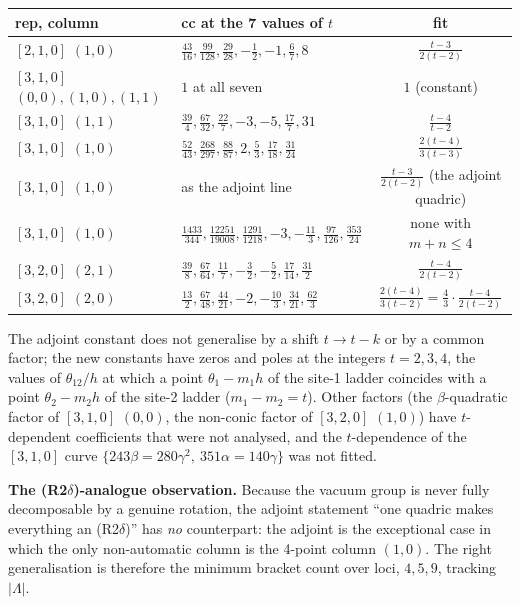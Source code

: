 \documentclass[10pt]{article}
\begin{document}
\begin{center}\small\setlength{\tabcolsep}{4pt}\begin{tabular}{@{}llc@{}}\toprule
\textbf{rep, column} & \textbf{cc at the 7 values of $t$} & \textbf{fit} \\\midrule
$[2,1,0]$ $(1,0)$ & $\tfrac{43}{16},\tfrac{99}{128},\tfrac{29}{28},-\tfrac12,-1,\tfrac67,8$ & $\tfrac{t-3}{2(t-2)}$ \\
$[3,1,0]$ $(0,0),(1,0),(1,1)$ & $1$ at all seven & $1$ (constant) \\
$[3,1,0]$ $(1,1)$ & $\tfrac{39}4,\tfrac{67}{32},\tfrac{22}7,-3,-5,\tfrac{17}7,31$ & $\tfrac{t-4}{t-2}$ \\
$[3,1,0]$ $(1,0)$ & $\tfrac{52}{43},\tfrac{268}{297},\tfrac{88}{87},2,\tfrac53,\tfrac{17}{18},\tfrac{31}{24}$ & $\tfrac{2(t-4)}{3(t-3)}$ \\
$[3,1,0]$ $(1,0)$ & as the adjoint line & $\tfrac{t-3}{2(t-2)}$ (the adjoint quadric) \\
$[3,1,0]$ $(1,0)$ & $\tfrac{1433}{344},\tfrac{12251}{19008},\tfrac{1291}{1218},-3,-\tfrac{11}3,\tfrac{97}{126},\tfrac{353}{24}$ & none with $m+n\le4$ \\
$[3,2,0]$ $(2,1)$ & $\tfrac{39}8,\tfrac{67}{64},\tfrac{11}7,-\tfrac32,-\tfrac52,\tfrac{17}{14},\tfrac{31}2$ & $\tfrac{t-4}{2(t-2)}$ \\
$[3,2,0]$ $(2,0)$ & $\tfrac{13}2,\tfrac{67}{48},\tfrac{44}{21},-2,-\tfrac{10}3,\tfrac{34}{21},\tfrac{62}3$ & $\tfrac{2(t-4)}{3(t-2)}=\tfrac43\cdot\tfrac{t-4}{2(t-2)}$ \\
\bottomrule\end{tabular}\end{center}
The adjoint constant does not generalise by a shift $t\to t-k$ or by a common factor; the new constants have zeros and poles at the integers $t=2,3,4$, the values of $\theta_{12}/h$ at which a point $\theta_1-m_1h$ of the site-1 ladder coincides with a point $\theta_2-m_2h$ of the site-2 ladder ($m_1-m_2=t$). Other factors (the $\beta$-quadratic factor of $[3,1,0]$ $(0,0)$, the non-conic factor of $[3,2,0]$ $(1,0)$) have $t$-dependent coefficients that were not analysed, and the $t$-dependence of the $[3,1,0]$ curve $\{243\beta=280\gamma^2,\ 351\alpha=140\gamma\}$ was not fitted.

\textbf{The (R2$\delta$)-analogue observation.} Because the vacuum group is never fully decomposable by a genuine rotation, the adjoint statement ``one quadric makes everything an (R2$\delta$)'' has \emph{no} counterpart: the adjoint is the exceptional case in which the only non-automatic column is the 4-point column $(1,0)$. The right generalisation is therefore the minimum bracket count over loci, $4,5,9$, tracking $|\Lambda|$.
\end{document}
